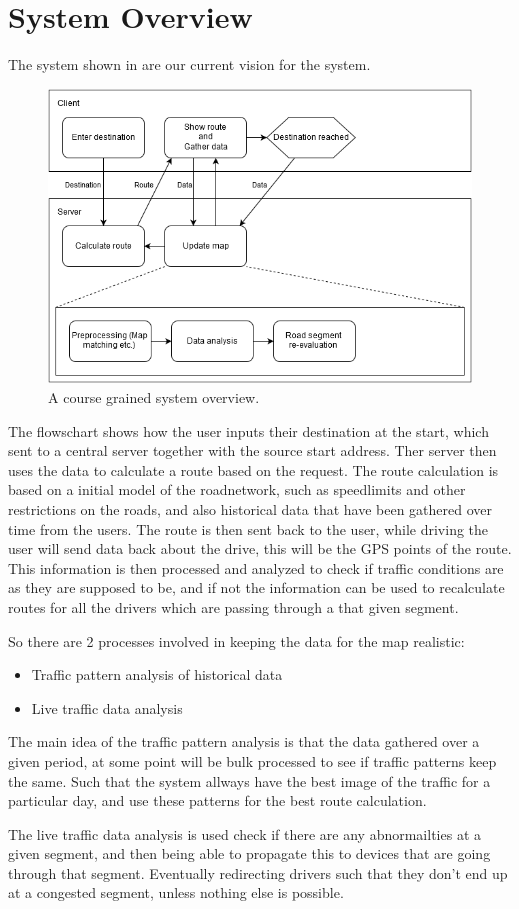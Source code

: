 \section{System Overview}
The system shown in  are our current vision for the system.

\begin{figure}[h!]
  \centering
    \includegraphics[width=1\textwidth]{figures/system-overview.png}
    \caption{A course grained system overview.}
    \label{fig:systemoverview}
\end{figure}

The flowschart shows how the user inputs their destination at the start, which sent to a central server together with the source start address. Ther server then uses the data to calculate a route based on the request. The route calculation is based on a initial model of the roadnetwork, such as speedlimits and other restrictions on the roads, and also historical data that have been gathered over time from the users. The route is then sent back to the user, while driving the user will send data back about the drive, this will be the GPS points of the route. This information is then processed and analyzed to check if traffic conditions are as they are supposed to be, and if not the information can be used to recalculate routes for all the drivers which are passing through a that given segment.

So there are 2 processes involved in keeping the data for the map realistic:
\begin{itemize}
	\item Traffic pattern analysis of historical data
	\item Live traffic data analysis
\end{itemize}

The main idea of the traffic pattern analysis is that the data gathered over a given period, at some point will be bulk processed to see if traffic patterns keep the same. Such that the system allways have the best image of the traffic for a particular day, and use these patterns for the best route calculation.

The live traffic data analysis is used check if there are any abnormailties at a given segment, and then being able to propagate this to devices that are going through that segment. Eventually redirecting drivers such that they don't end up at a congested segment, unless nothing else is possible.